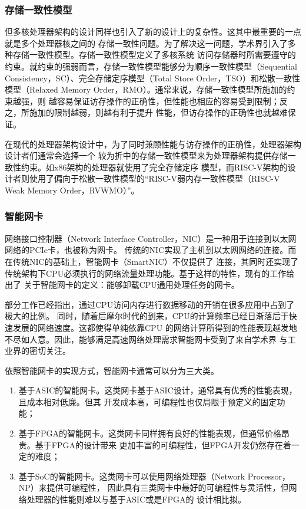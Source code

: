 \subsubsection{存储一致性模型}
\label{section:background_consistent_model}

但多核处理器架构的设计同样也引入了新的设计上的复杂性。这其中最重要的一点就是多个处理器核之间的
存储一致性问题。为了解决这一问题，学术界引入了多种存储一致性模型。存储一致性模型定义了多核系统
访问存储器时所需要遵守的约束。就约束的强弱而言，存储一致性模型能够分为顺序一致性模型（Sequential
Consistency，SC）、完全存储定序模型（Total Store Order，TSO）和松散一致性模型（Relaxed
Memory Order，RMO）\cite{sorin2011primer}。通常来说，存储一致性模型所施加的约束越强，则
越容易保证访存操作的正确性，但性能也相应的容易受到限制；反之，所施加的限制越弱，则越有利于提升
性能，但访存操作的正确性也就越难保证。

在现代的处理器架构设计中，为了同时兼顾性能与访存操作的正确性，处理器架构设计者们通常会选择一个
较为折中的存储一致性模型来为处理器架构提供存储一致性约束。如x86架构的处理器就使用了完全存储定序
模型，而RISC-V架构的设计者则使用了偏向于松散一致性模型的“RISC-V弱内存一致性模型（RISC-V Weak
Memory Order，RVWMO）”\cite{waterman2016design,waterman2014risc,waterman2015risc}。

\subsubsection{智能网卡}
\label{section:background_smartnic}

网络接口控制器（Network Interface Controller，NIC）是一种用于连接到以太网网络的PCIe卡，也被称为网卡。
传统的NIC实现了主机到以太网网络的连接。而在传统NIC的基础上，智能网卡（SmartNIC）不仅提供了
连接，其同时还实现了传统架构下CPU必须执行的网络流量处理功能。基于这样的特性，现有的工作给出了
关于智能网卡的定义：能够卸载CPU通用处理任务的网卡\cite{pcmag_smartnic,maxiaoxiao2022survey}。

部分工作已经指出，通过CPU访问内存进行数据移动的开销在很多应用中占到了极大的比例\cite{maxiaoxiao2022survey}。
同时，随着后摩尔时代的到来，CPU的计算频率已经日渐落后于快速发展的网络速度。这都使得单纯依靠CPU
的网络计算所得到的性能表现越发地不尽如人意。因此，能够满足高速网络处理需求智能网卡受到了来自学术界
与工业界的密切关注。

依照智能网卡的实现方式，智能网卡通常可以分为三大类\cite{bhalgat2021smartnic}。

\begin{enumerate}
  \item 基于ASIC的智能网卡。这类网卡基于ASIC设计，通常具有优秀的性能表现，且成本相对低廉。但其
        开发成本高，可编程性也仅局限于预定义的固定功能；
  \item 基于FPGA的智能网卡。这类网卡同样拥有良好的性能表现，但通常价格昂贵。基于FPGA的设计带来
        更加丰富的可编程性，但FPGA开发仍然存在着一定的难度；
  \item 基于SoC的智能网卡。这类网卡可以使用网络处理器（Network Processor，NP）来提供可编程性，
        因此具有三类网卡中最好的可编程性与灵活性，但网络处理器的性能则难以与基于ASIC或是FPGA的
        设计相比拟。
\end{enumerate}

